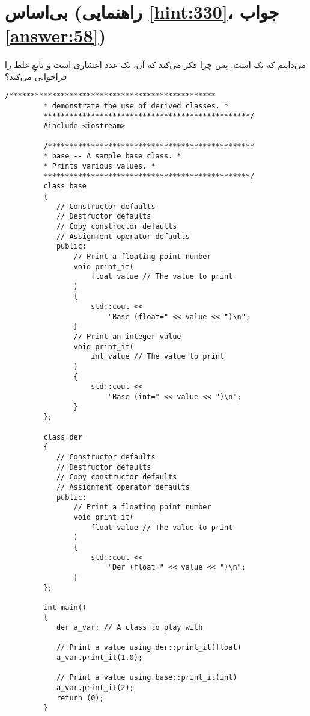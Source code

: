 \section[بی‌اساس]{بی‌اساس \protect{} (راهنمایی \ref{hint:330}، جواب \ref{answer:58})}
\paragraph{}\label{prog:43}
می‌دانیم که  یک  است. پس چرا  فکر می‌کند که آن، یک عدد اعشاری است و تابعِ غلط را فراخوانی می‌کند؟

\begin{LTR}
    \begin{lstlisting}[style=C++Style]
         /************************************************
         * demonstrate the use of derived classes. *
         ************************************************/
         #include <iostream>

         /************************************************
         * base -- A sample base class. *
         * Prints various values. *
         ************************************************/
         class base
         {
         	// Constructor defaults
         	// Destructor defaults
         	// Copy constructor defaults
         	// Assignment operator defaults
         	public:
         		// Print a floating point number
         		void print_it(
         			float value // The value to print
         		)
         		{
         			std::cout <<
         				"Base (float=" << value << ")\n";
         		}
         		// Print an integer value
         		void print_it(
         			int value // The value to print
         		)
         		{
         			std::cout <<
         				"Base (int=" << value << ")\n";
         		}
         };

         class der
         {
         	// Constructor defaults
         	// Destructor defaults
         	// Copy constructor defaults
         	// Assignment operator defaults
         	public:
         		// Print a floating point number
         		void print_it(
         			float value // The value to print
         		)
         		{
         			std::cout <<
         				"Der (float=" << value << ")\n";
         		}
         };

         int main()
         {
         	der a_var; // A class to play with

         	// Print a value using der::print_it(float)
         	a_var.print_it(1.0);

         	// Print a value using base::print_it(int)
         	a_var.print_it(2);
         	return (0);
         }
    \end{lstlisting}
\end{LTR}

